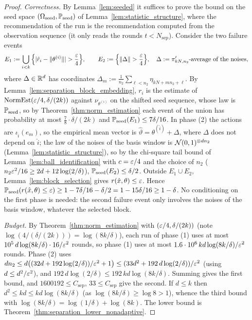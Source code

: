 \begin{proof}
\leanok
{}
\emph{Correctness.} By Lemma~\ref{lem:seeded} it suffices to prove the bound on the seed space
$(\Omega_{\mathrm{seed}}, \mathbb{P}_{\mathrm{seed}})$ of Lemma~\ref{lem:statistic_structure}, where
the recommendation of the run is the recommendation computed from the observation sequence
(it only reads the rounds $t < N_{\mathrm{sep}}$). Consider the two failure events
\[
  E_1 := \bigcup_{i<k}\Big\{ \lvert \hat r_i - \lVert \theta^{(i)} \rVert \rvert > \frac{\varepsilon}4 \Big\},
  \qquad
  E_2 := \Big\{ \lVert \Delta \rVert > \frac{\varepsilon}4 \Big\},
  \quad \Delta := \pi'_{kN, n_2}\text{-average of the noises},
\]
where $\Delta \in \mathbb{R}^d$ has coordinates $\Delta_m := \frac1{n_2}\sum_{\ell<n_2}\eta_{kN + mn_2 + \ell}$.
By Lemma~\ref{lem:separation_block_embedding}, $\hat r_i$ is the estimate of
$\mathrm{NormEst}(\varepsilon/4, \delta/(2k))$ against $\nu_{\theta^{(i)}}$ on the shifted seed sequence,
whose law is $\mathbb{P}_{\mathrm{seed}}$, so by Theorem~\ref{thm:norm_estimation} each event of the
union has probability at most $\tfrac78\cdot\delta/(2k)$ and $\mathbb{P}_{\mathrm{seed}}(E_1) \le 7\delta/16$.
In phase (2) the actions are $\iota_{\hat i}(e_m)$, so the empirical mean vector is
$\hat\vartheta = \theta^{(\hat i)} + \Delta$, where $\Delta$ does not depend on $\hat i$; the law of
the noises of the basis window is $\mathcal{N}(0,1)^{\otimes dn_2}$
(Lemma~\ref{lem:statistic_structure}), so by the chi-square tail bound of
Lemma~\ref{lem:ball_identification} with $c = \varepsilon/4$ and the choice of $n_2$
($n_2\varepsilon^2/16 \ge 2d + 12\log(2/\delta)$), $\mathbb{P}_{\mathrm{seed}}(E_2) \le \delta/2$. Outside
$E_1 \cup E_2$, Lemma~\ref{lem:block_selection} gives $r(\hat{x},\theta) \le \varepsilon$. Hence
$\mathbb{P}_{\mathrm{seed}}(r(\hat{x},\theta) \le \varepsilon) \ge 1 - 7\delta/16 - \delta/2 = 1 - 15\delta/16 \ge 1 - \delta$.
No conditioning on the first phase is needed: the second failure event only involves the
noises of the basis window, whatever the selected block.

\emph{Budget.} By Theorem~\ref{thm:norm_estimation} with $(\varepsilon/4, \delta/(2k))$
(note $\log(4/(\delta/(2k))) = \log(8k/\delta)$), each run of
phase (1) uses at most $10^5\,d\log(8k/\delta)\cdot 16/\varepsilon^2$ rounds, so phase (1) uses at
most $1.6\cdot10^6\,kd\log(8k/\delta)/\varepsilon^2$ rounds. Phase (2) uses
$dn_2 \le d\big( (32d + 192\log(2/\delta))/\varepsilon^2 + 1 \big) \le (33d^2 + 192\,d\log(2/\delta))/\varepsilon^2$
(using $d \le d^2/\varepsilon^2$), and $192\,d\log(2/\delta) \le 192\,kd\log(8k/\delta)$. Summing gives
the first bound, and $1600192 \le C_{\mathrm{sep}}$, $33 \le C_{\mathrm{sep}}$ give the second. If
$d \le k$ then $d^2 \le kd \le kd\log(8k/\delta)$ (as $\log(8k/\delta) \ge \log 8 > 1$), whence
the third bound with $\log(8k/\delta) = \log(1/\delta) + \log(8k)$. The lower bound is
Theorem~\ref{thm:separation_lower_nonadaptive}.
\end{proof}

